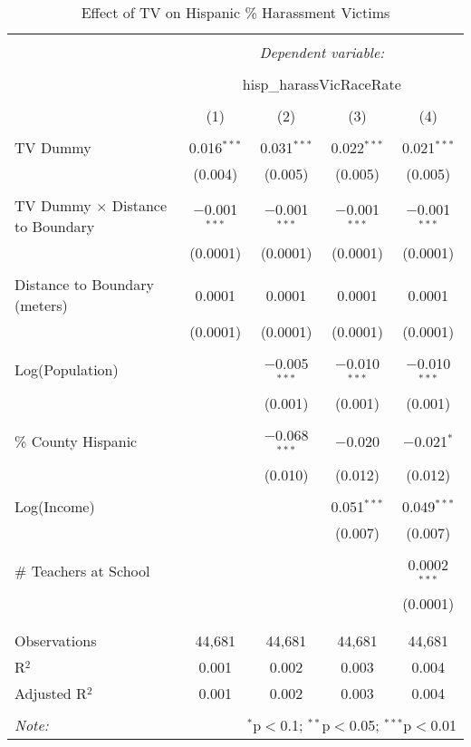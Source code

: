 
\begin{table}[!htbp] \centering 
  \caption{Effect of TV on Hispanic \% Harassment Victims} 
  \label{} 
\begin{tabular}{@{\extracolsep{-2pt}}lcccc} 
\\[-1.8ex]\hline 
\hline \\[-1.8ex] 
 & \multicolumn{4}{c}{\textit{Dependent variable:}} \\ 
\cline{2-5} 
\\[-1.8ex] & \multicolumn{4}{c}{hisp\_harassVicRaceRate} \\ 
\\[-1.8ex] & (1) & (2) & (3) & (4)\\ 
\hline \\[-1.8ex] 
 TV Dummy & 0.016$^{***}$ & 0.031$^{***}$ & 0.022$^{***}$ & 0.021$^{***}$ \\ 
  & (0.004) & (0.005) & (0.005) & (0.005) \\ 
  & & & & \\ 
 TV Dummy $\times$ Distance to Boundary & $-$0.001$^{***}$ & $-$0.001$^{***}$ & $-$0.001$^{***}$ & $-$0.001$^{***}$ \\ 
  & (0.0001) & (0.0001) & (0.0001) & (0.0001) \\ 
  & & & & \\ 
 Distance to Boundary (meters) & 0.0001 & 0.0001 & 0.0001 & 0.0001 \\ 
  & (0.0001) & (0.0001) & (0.0001) & (0.0001) \\ 
  & & & & \\ 
 Log(Population) &  & $-$0.005$^{***}$ & $-$0.010$^{***}$ & $-$0.010$^{***}$ \\ 
  &  & (0.001) & (0.001) & (0.001) \\ 
  & & & & \\ 
 \% County Hispanic &  & $-$0.068$^{***}$ & $-$0.020 & $-$0.021$^{*}$ \\ 
  &  & (0.010) & (0.012) & (0.012) \\ 
  & & & & \\ 
 Log(Income) &  &  & 0.051$^{***}$ & 0.049$^{***}$ \\ 
  &  &  & (0.007) & (0.007) \\ 
  & & & & \\ 
 \# Teachers at School &  &  &  & 0.0002$^{***}$ \\ 
  &  &  &  & (0.0001) \\ 
  & & & & \\ 
\hline \\[-1.8ex] 
Observations & 44,681 & 44,681 & 44,681 & 44,681 \\ 
R$^{2}$ & 0.001 & 0.002 & 0.003 & 0.004 \\ 
Adjusted R$^{2}$ & 0.001 & 0.002 & 0.003 & 0.004 \\ 
\hline 
\hline \\[-1.8ex] 
\textit{Note:}  & \multicolumn{4}{r}{$^{*}$p$<$0.1; $^{**}$p$<$0.05; $^{***}$p$<$0.01} \\ 
\end{tabular} 
\end{table} 
